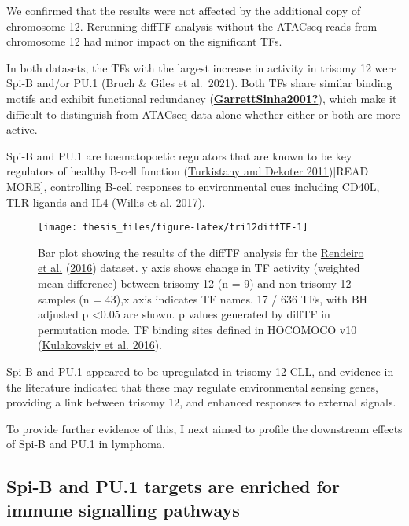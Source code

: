 \documentclass[11pt, a4paper, twosided]{book}
\begin{document}
We confirmed that the results were not affected by the additional copy of chromosome 12. Rerunning diffTF analysis without the ATACseq reads from chromosome 12 had minor impact on the significant TFs.

In both datasets, the TFs with the largest increase in activity in trisomy 12 were Spi-B and/or PU.1 (Bruch \& Giles et al.~2021). Both TFs share similar binding motifs and exhibit functional redundancy (\protect\hyperlink{ref-GarrettSinha2001}{\textbf{GarrettSinha2001?}}), which make it difficult to distinguish from ATACseq data alone whether either or both are more active.

Spi-B and PU.1 are haematopoetic regulators that are known to be key regulators of healthy B-cell function (\protect\hyperlink{ref-Turkistany2011}{Turkistany and Dekoter 2011}){[}READ MORE{]}, controlling B-cell responses to environmental cues including CD40L, TLR ligands and IL4 (\protect\hyperlink{ref-Willis2017}{Willis et al. 2017}).


\begin{figure}

{\centering \texttt{[image: thesis\_files/figure-latex/tri12diffTF-1]} 

}

\caption{Bar plot showing the results of the diffTF analysis for the \protect\hyperlink{ref-Rendeiro2016}{Rendeiro et al.} (\protect\hyperlink{ref-Rendeiro2016}{2016}) dataset. y axis shows change in TF activity (weighted mean difference) between trisomy 12 (n = 9) and non-trisomy 12 samples (n = 43),x axis indicates TF names. 17 / 636 TFs, with BH adjusted p \textless0.05 are shown. p values generated by diffTF in permutation mode. TF binding sites defined in HOCOMOCO v10 (\protect\hyperlink{ref-HOCOMOCO}{Kulakovskiy et al. 2016}).}\label{fig:tri12diffTF}
\end{figure}
Spi-B and PU.1 appeared to be upregulated in trisomy 12 CLL, and evidence in the literature indicated that these may regulate environmental sensing genes, providing a link between trisomy 12, and enhanced responses to external signals.

To provide further evidence of this, I next aimed to profile the downstream effects of Spi-B and PU.1 in lymphoma.

\hypertarget{spi-b-and-pu.1-targets-are-enriched-for-immune-signalling-pathways}{%
\subsection{Spi-B and PU.1 targets are enriched for immune signalling pathways}\label{spi-b-and-pu.1-targets-are-enriched-for-immune-signalling-pathways}}
\end{document}
